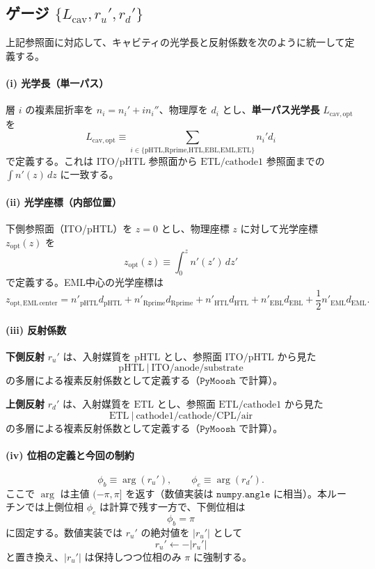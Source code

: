 \subsection{ゲージ \(\{L_{\mathrm{cav}}, r_u', r_d'\}\)}
上記参照面に対応して、キャビティの光学長と反射係数を次のように統一して定義する。

\paragraph{(i) 光学長（単一パス）}
層 \(i\) の複素屈折率を \(n_i = n_i' + i n_i''\)、物理厚を \(d_i\) とし、\textbf{単一パス光学長} \(L_{\mathrm{cav,opt}}\) を
\[
L_{\mathrm{cav,opt}} \equiv \sum_{i\in \{\text{pHTL,Rprime,HTL,EBL,EML,ETL}\}} n_i' d_i
\]
で定義する。これは \(\text{ITO}/\text{pHTL}\) 参照面から \(\text{ETL}/\text{cathode1}\) 参照面までの \(\int n'(z)\,dz\) に一致する。

\paragraph{(ii) 光学座標（内部位置）}
下側参照面（ITO/pHTL）を \(z=0\) とし、物理座標 \(z\) に対して光学座標 \(z_{\mathrm{opt}}(z)\) を
\[
z_{\mathrm{opt}}(z)\equiv \int_0^{z} n'(z')\,dz'
\]
で定義する。EML中心の光学座標は
\[
z_{\mathrm{opt,EML\,center}}=
n'_{\mathrm{pHTL}}d_{\mathrm{pHTL}}+
n'_{\mathrm{Rprime}}d_{\mathrm{Rprime}}+
n'_{\mathrm{HTL}}d_{\mathrm{HTL}}+
n'_{\mathrm{EBL}}d_{\mathrm{EBL}}+
\frac{1}{2}n'_{\mathrm{EML}}d_{\mathrm{EML}}.
\]

\paragraph{(iii) 反射係数}
\textbf{下側反射} \(r_u'\) は、入射媒質を \(\text{pHTL}\) とし、参照面 \(\text{ITO}/\text{pHTL}\) から見た
\[
\text{pHTL}\ \Big|\ \text{ITO} / \text{anode} / \text{substrate}
\]
の多層による複素反射係数として定義する（\(\texttt{PyMoosh}\) で計算）。

\textbf{上側反射} \(r_d'\) は、入射媒質を \(\text{ETL}\) とし、参照面 \(\text{ETL}/\text{cathode1}\) から見た
\[
\text{ETL}\ \Big|\ \text{cathode1} / \text{cathode} / \text{CPL} / \text{air}
\]
の多層による複素反射係数として定義する（\(\texttt{PyMoosh}\) で計算）。

\paragraph{(iv) 位相の定義と今回の制約}
\[
\phi_b \equiv \arg(r_u'),\qquad \phi_e \equiv \arg(r_d').
\]
ここで \(\arg\) は主値 \((-\pi,\pi]\) を返す（数値実装は \(\texttt{numpy.angle}\) に相当）。本ルーチンでは上側位相 \(\phi_e\) は計算で残す一方で、下側位相は
\[
\phi_b = \pi
\]
に固定する。数値実装では \(r_u'\) の絶対値を \(|r_u'|\) として
\[
r_u' \leftarrow -|r_u'|
\]
と置き換え、\(|r_u'|\) は保持しつつ位相のみ \(\pi\) に強制する。

